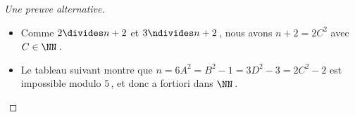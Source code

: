 \begin{proof}[Une preuve alternative]
\begin{itemize}
		\item Comme $2 \divides n+2$ et $3 \ndivides n+2$\,, nous avons $n+2 = 2 C^2$ avec $C \in \NN$\,.

		\item Le tableau suivant montre que $n = 6 A^2 = B^2 - 1 = 3 D^2 - 3 = 2 C^2 - 2$ est impossible modulo $5$\,, et donc a fortiori dans $\NN$\,.  
	\end{itemize}

	\begin{center}
	\end{center}
\end{proof}

